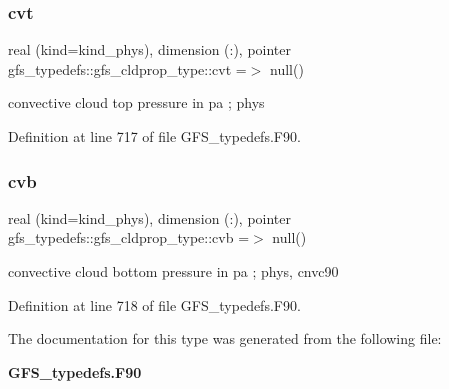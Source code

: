 \subsubsection{cvt}
{\footnotesize\ttfamily real (kind=kind\+\_\+phys), dimension (\+:), pointer gfs\+\_\+typedefs\+::gfs\+\_\+cldprop\+\_\+type\+::cvt =$>$ null()}



convective cloud top pressure in pa ; phys 



Definition at line 717 of file G\+F\+S\+\_\+typedefs.\+F90.

\mbox{\label{structgfs__typedefs_1_1gfs__cldprop__type_ac4f233af102f2a8ea128ca97fadb97d7}} 
\subsubsection{cvb}
{\footnotesize\ttfamily real (kind=kind\+\_\+phys), dimension (\+:), pointer gfs\+\_\+typedefs\+::gfs\+\_\+cldprop\+\_\+type\+::cvb =$>$ null()}



convective cloud bottom pressure in pa ; phys, cnvc90 



Definition at line 718 of file G\+F\+S\+\_\+typedefs.\+F90.



The documentation for this type was generated from the following file\+:\begin{DoxyCompactItemize}
\item 
\textbf{ G\+F\+S\+\_\+typedefs.\+F90}\end{DoxyCompactItemize}
